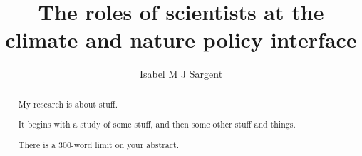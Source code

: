 
\title{The roles of scientists at the climate and nature policy interface}
\author{Isabel M J Sargent}
\raggedbottom
\maketitle

\newpage
\makedeclaration

\begin{abstract} %
My research is about stuff.

It begins with a study of some stuff, and then some other stuff and things.

There is a 300-word limit on your abstract.
\end{abstract}

